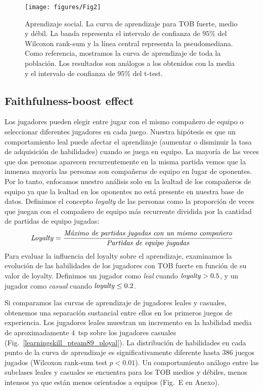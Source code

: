 \documentclass[a4paper,11pt]{book}
\theoremstyle{definition}
\begin{document}
\begin{figure}[ht!]
\centering
\texttt{[image: figures/Fig2]}
\caption{
Aprendizaje social.
%
La curva de aprendizaje para TOB fuerte, medio y débil.
%
La banda representa el intervalo de confianza de $95\%$ del Wilcoxon rank-sum y la l\'inea central representa la pseudomediana.
%
Como referencia, mostramos la curva de aprendizaje de toda la poblaci\'on.
%
Los resultados son análogos a los obtenidos con la media y el intervalo de confianza de $95\%$ del t-test.
}
\label{learningskill_team_hasta4team}
\end{figure}


\subsection{Faithfulness-boost effect}

Los jugadores pueden elegir entre jugar con el mismo compañero de equipo o seleccionar diferentes jugadores en cada juego.
%
Nuestra hip\'otesis es que un comportamiento leal puede afectar el aprendizaje (aumentar o disminuir la tasa de adquisici\'on de habilidades) cuando se juega en equipo.
%
La mayor\'ia de las veces que dos personas aparecen recurrentemente en la misma partida vemos que la inmensa mayor\'ia las personas son compañeras de equipo en lugar de oponentes.
%
Por lo tanto, enfocamos nuestro análisis solo en la lealtad de los compañeros de equipo ya que la lealtad en los oponentes no está presente en nuestra base de datos.
%
Definimos el concepto \emph{loyalty} de las personas como la proporci\'on de veces que juegan con el compañero de equipo más recurrente dividida por la cantidad de partidas de equipo jugadas:
%
\begin{equation}
\text{\emph{Loyalty}} = \frac{\text{\emph{Máximo de partidas jugadas con un mismo compañero}}}{\text{\emph{Partidas de equipo jugadas}}}
\end{equation}
%
Para evaluar la influencia del loyalty sobre el aprendizaje, examinamos la evoluci\'on de las habilidades de los jugadores con TOB fuerte en funci\'on de su valor de loyalty.
%
Definimos un jugador como \emph{leal} cuando $\text{\emph{loyalty}}>0.5$, y un jugador como \emph{casual} cuando $\text{\emph{loyalty}}\leq 0.2$.


Si comparamos las curvas de aprendizaje de jugadores leales y casuales, obtenemos una separaci\'on sustancial entre ellos en los primeros juegos de experiencia.
%
Los jugadores leales muestran un incremento en la habilidad media de aproximadamente $4$~tsp sobre los jugadores casuales (Fig.~\ref{learningskill_pteam89_ployal}).
%
La distribuci\'on de habilidades en cada punto de la curva de aprendizaje es significativamente diferente hasta $386$ juegos jugados (Wilcoxon rank-sum test $p<0.01$).
%
Un comportamiento análogo entre las subclases leales y casuales se encuentra para los TOB medios y débiles, menos intensos ya que están menos orientados a equipos (Fig.~E en Anexo).
\end{document}
